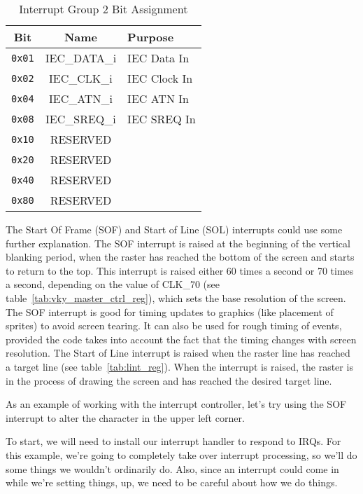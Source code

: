 \begin{table}[ht]
	\begin{center}
		\begin{tabular}{|c|c|l|} \hline
            Bit & Name & Purpose \\ \hline\hline
            \verb+0x01+ & IEC\_DATA\_i & IEC Data In \\ \hline
            \verb+0x02+ & IEC\_CLK\_i & IEC Clock In  \\ \hline
            \verb+0x04+ & IEC\_ATN\_i & IEC ATN In  \\ \hline
            \verb+0x08+ & IEC\_SREQ\_i & IEC SREQ In  \\ \hline
            \verb+0x10+ & RESERVED & \\ \hline
            \verb+0x20+ & RESERVED & \\ \hline
            \verb+0x40+ & RESERVED & \\ \hline
            \verb+0x80+ & RESERVED & \\ \hline
        \end{tabular}
    \end{center}
	\caption{Interrupt Group 2 Bit Assignment}
	\label{tab:int_group_2}
\end{table}

The Start Of Frame (SOF) and Start of Line (SOL) interrupts could use some further explanation. The SOF interrupt is raised at the beginning of the vertical blanking period, when the raster has reached the bottom of the screen and starts to return to the top. This interrupt is raised either 60 times a second or 70 times a second, depending on the value of CLK\_70 (see table~\ref{tab:vky_master_ctrl_reg}), which sets the base resolution of the screen. The SOF interrupt is good for timing updates to graphics (like placement of sprites) to avoid screen tearing. It can also be used for rough timing of events, provided the code takes into account the fact that the timing changes with screen resolution. The Start of Line interrupt is raised when the raster line has reached a target line (see table~\ref{tab:lint_reg}). When the interrupt is raised, the raster is in the process of drawing the screen and has reached the desired target line.

As an example of working with the interrupt controller, let's try using the SOF interrupt to alter the character in the upper left corner.

To start, we will need to install our interrupt handler to respond to IRQs. For this example, we're going to completely take over interrupt processing, so we'll do some things we wouldn't ordinarily do. Also, since an interrupt could come in while we're setting things, up, we need to be careful about how we do things.


